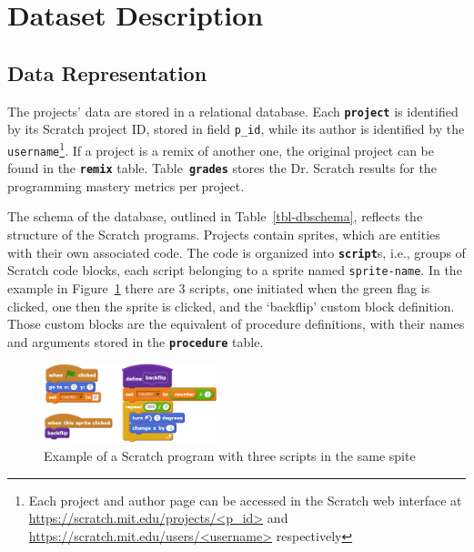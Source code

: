 \documentclass[10pt, conference]{IEEEtran}
\begin{document}
\section{Dataset Description}

\subsection{Data Representation}

The projects' data are stored in a relational database. Each \textbf{\texttt{project}} is identified by its Scratch project ID, stored in field \texttt{p\_id}, while its author is identified by the \texttt{username}\footnote{\label{fn-authorpage}Each project and author page can be accessed in the Scratch web interface at \url{https://scratch.mit.edu/projects/<p_id>} and \url{https://scratch.mit.edu/users/<username>} respectively}.
If a project is a remix of another one, the original project can be found in the \textbf{\texttt{remix}} table.
Table~\textbf{\texttt{grades}} stores the Dr. Scratch results for the programming mastery metrics per project.

The schema of the database, outlined in Table~\ref{tbl-dbschema}, reflects the structure of the Scratch programs.
Projects contain sprites, which are entities with their own associated code.
The code is organized into \textbf{\texttt{script}}s, i.e., groups of Scratch code blocks, each script belonging to a sprite named \texttt{sprite-name}.
In the example in Figure~\ref{fig-scratchExample} there are 3 scripts, one initiated when the green flag is clicked, one then the sprite is clicked, and the `backflip' custom block definition.
Those custom blocks are the equivalent of procedure definitions, with their names and arguments stored in the \textbf{\texttt{procedure}} table.

 \begin{figure}
 	\centering
 	\includegraphics[width=0.45\textwidth]{scratchExample}
 	\caption{Example of a Scratch program with three scripts in the same spite}
 	\label{fig-scratchExample}
 \end{figure}
 
\end{document}
